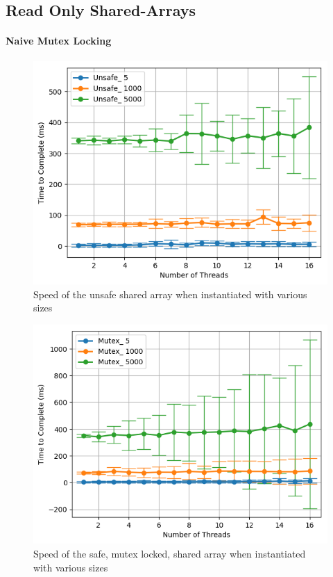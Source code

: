 \documentclass[11pt]{article}
\begin{document}
\subsection{Read Only Shared-Arrays}
\paragraph{Naive Mutex Locking}

\begin{figure}
\centering
\includegraphics[scale=0.65]{step3_1.png}
\caption{Speed of the unsafe shared array when instantiated with various sizes}
\label{fig:step3_1}
\end{figure}


\begin{figure}
\centering
\includegraphics[scale=0.65]{step3_2.png}
\caption{Speed of the safe, mutex locked, shared array when instantiated with various sizes}
\label{fig:step3_2}
\end{figure}
\end{document}
